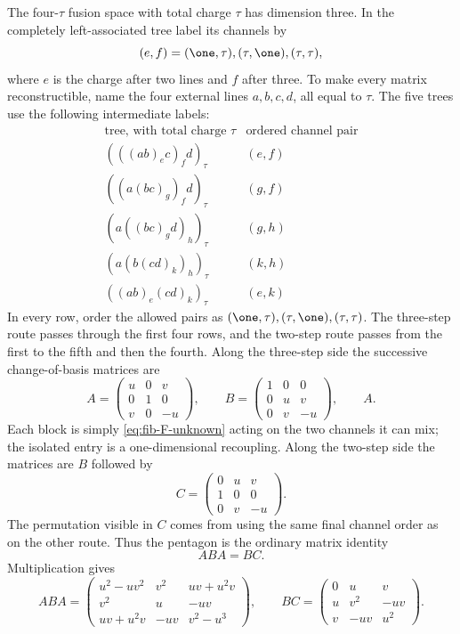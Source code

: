 The four-$\tau$ fusion space with total charge $\tau$ has dimension
three.  In the completely left-associated tree label its channels by
\[
 (e,f)=(\one,\tau),(\tau,\one),(\tau,\tau),
\]
where $e$ is the charge after two lines and $f$ after three.  To make
every matrix reconstructible, name the four external lines $a,b,c,d$,
all equal to $\tau$.  The five trees use the following intermediate
labels:
\[
\begin{array}{c|c}
\text{tree, with total charge }\tau&\text{ordered channel pair}\\\hline
(((ab)_e c)_f d)_\tau&(e,f)\\
((a(bc)_g)_f d)_\tau&(g,f)\\
(a((bc)_g d)_h)_\tau&(g,h)\\
(a(b(cd)_k)_h)_\tau&(k,h)\\
((ab)_e(cd)_k)_\tau&(e,k)
\end{array}
\]
In every row, order the allowed pairs as
$(\one,\tau),(\tau,\one),(\tau,\tau)$.
The three-step route passes through the first four rows, and the
two-step route passes from the first to the fifth and then the fourth.
Along the three-step side the successive change-of-basis matrices are
\[
 A=\begin{pmatrix}u&0&v\\0&1&0\\v&0&-u\end{pmatrix},
 \qquad
 B=\begin{pmatrix}1&0&0\\0&u&v\\0&v&-u\end{pmatrix},
 \qquad A.
\]
Each block is simply \eqref{eq:fib-F-unknown} acting on the two
channels it can mix; the isolated entry is a one-dimensional
recoupling.  Along the two-step side the matrices are $B$ followed by
\[
 C=\begin{pmatrix}0&u&v\\1&0&0\\0&v&-u\end{pmatrix}.
\]
The permutation visible in $C$ comes from using the same final channel
order as on the other route.  Thus the pentagon is the ordinary matrix
identity
\begin{equation}
 ABA=BC.
 \label{eq:fib-pentagon-small}
\end{equation}
Multiplication gives
\[
 ABA=\begin{pmatrix}
 u^2-uv^2&v^2&uv+u^2v\\
 v^2&u&-uv\\
 uv+u^2v&-uv&v^2-u^3
 \end{pmatrix},\qquad
 BC=\begin{pmatrix}
 0&u&v\\u&v^2&-uv\\v&-uv&u^2
 \end{pmatrix}.
\]
